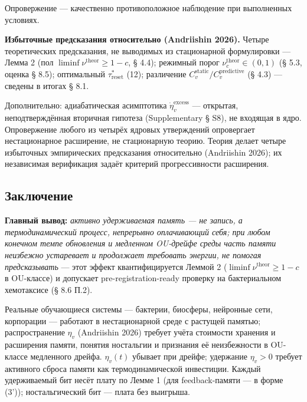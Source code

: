 \documentclass[pdflatex,sn-mathphys-ay]{sn-jnl}
\begin{document}
Опровержение --- качественно противоположное наблюдение при выполненных условиях.



\textbf{Избыточные предсказания относительно (Andriishin 2026).} Четыре теоретических предсказания, не выводимых из стационарной формулировки --- Лемма 2 (пол \(\liminf \nu^{\text{theor}} \ge 1-c\), § 4.4); режимный порог \(\nu_c^{\text{theor}} \in (0,1)\) (§ 5.3, оценка § 8.5); оптимальный \(\tau_{\text{reset}}^*\) (12); различение \(C_v^{\text{static}}/C_v^{\text{predictive}}\) (§ 4.3) --- сведены в итогах § 8.1.



Дополнительно: адиабатическая асимптотика \(\dot\eta_v^{\text{excess}}\) --- открытая, неподтверждённая вторичная гипотеза (Supplementary § S8), не входящая в ядро. Опровержение любого из четырёх ядровых утверждений опровергает нестационарное расширение, не стационарную теорию. Теория делает четыре избыточных эмпирических предсказания относительно (Andriishin 2026); их независимая верификация задаёт критерий прогрессивности расширения.



\subsection{Заключение}\label{ux437ux430ux43aux43bux44eux447ux435ux43dux438ux435}



\textbf{Главный вывод:} \emph{активно удерживаемая память --- не запись, а термодинамический процесс, непрерывно оплачивающий себя; при любом конечном темпе обновления и медленном OU-дрейфе среды часть памяти неизбежно устаревает и продолжает требовать энергии, не помогая предсказывать} --- этот эффект квантифицируется Леммой 2 (\(\liminf \nu^{\text{theor}} \ge 1 - c\) в OU-классе) и допускает pre-registration-ready проверку на бактериальном хемотаксисе (§ 8.6 П.2).



Реальные обучающиеся системы --- бактерии, биосферы, нейронные сети, корпорации --- работают в нестационарной среде с растущей памятью; распространение \(\eta_v\) (Andriishin 2026) требует учёта стоимости хранения и расширения памяти, понятия ностальгии и признания её неизбежности в OU-классе медленного дрейфа. \(\eta_v(t)\) убывает при дрейфе; удержание \(\eta_v > 0\) требует активного сброса памяти как термодинамической инвестиции. Каждый удерживаемый бит несёт плату по Лемме 1 (для feedback-памяти --- в форме (3')); ностальгический бит --- плата без выигрыша.
\end{document}

